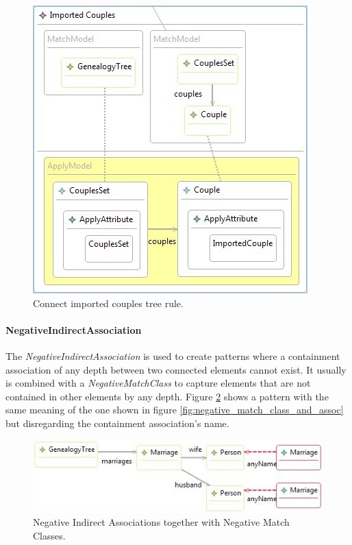 \begin{figure}[h]
\begin{center}
  \includegraphics[scale=0.7]{imgs/connect_imported_couples.jpg}
  \caption{Connect imported couples tree rule.}
  \label{fig:connect_imported_couples}
\end{center}
\end{figure}







\paragraph{NegativeIndirectAssociation}

The \emph{NegativeIndirectAssociation} is used to create patterns where a
containment association of any depth between two connected elements cannot
exist. It usually is combined with a \emph{NegativeMatchClass} to capture
elements that are not contained in other elements by any depth. Figure
\ref{fig:neg_indir_assoc_example} shows a pattern with the same meaning of the
one shown in figure \ref{fig:negative_match_class_and_assoc} but disregarding
the containment association's name.

\begin{figure}[h]
\begin{center}
  \includegraphics[scale=0.7]{imgs/neg_indir_assoc_example.jpg}
  \caption{Negative Indirect Associations together with Negative Match Classes.}
  \label{fig:neg_indir_assoc_example}
\end{center}
\end{figure}


